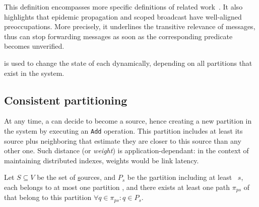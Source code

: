 This definition encompasses more specific definitions of related
work~\cite{hsiao2005scoped, lue2006scoped, wang2015prodiluvian}.  It
also highlights that epidemic propagation and scoped broadcast have
well-aligned preoccupations. More precisely, it underlines the transitive relevance of
messages, thus \processes can stop forwarding messages as soon as the
corresponding predicate becomes unverified.

\NAMEB is used to change the state of each \process dynamically, depending on all partitions that exist in the system.



\subsection{Consistent partitioning}

At any time, a \process can decide to become a source, hence creating
a new partition in the system by executing an \texttt{Add}
operation. This partition includes at least its source plus
neighboring \processes that estimate they are closer to this source
than any other one. Such distance (or \emph{weight}) is
application-dependant: in the context of maintaining distributed
indexes, weights would be link latency.

\begin{definition}
  Let $S \subseteq V$ be the set of \underline{s}ources, and $P_s$ be
  the \underline{p}artition including at least \Process~$s$, each
  \process belongs to at most one partition , and there exists at least one path $\pi_{ps}$ of
  \processes that belong to this partition $\forall q \in \pi_{ps}: q
  \in P_s$.
\end{definition}

